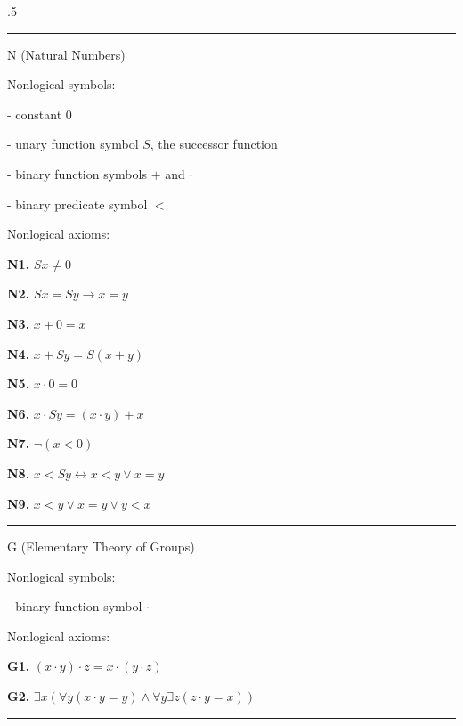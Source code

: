 \vglue .5\baselineskip

\hrule
\beginsection N (Natural Numbers)

Nonlogical symbols:
\item{-} constant $0$
\item{-} unary function symbol $S$, the successor function
\item{-} binary function symbols $+$ and $\cdot$
\item{-} binary predicate symbol $<$
\smallskip

\noindent Nonlogical axioms:
\item{} {\bf N1.} $Sx \ne 0$
\item{} {\bf N2.} $Sx = Sy \to x = y$
\item{} {\bf N3.} $x + 0 = x$
\item{} {\bf N4.} $x + Sy = S(x + y)$
\item{} {\bf N5.} $x \cdot 0 = 0$
\item{} {\bf N6.} $x \cdot Sy = (x \cdot y) + x$
\item{} {\bf N7.} $\neg (x < 0)$
\item{} {\bf N8.} $x < Sy \leftrightarrow x < y \lor x = y$
\item{} {\bf N9.} $x < y \lor x = y \lor y < x$
\smallskip
\hrule

\beginsection G (Elementary Theory of Groups)

Nonlogical symbols:
\item{-} binary function symbol $\cdot$
\smallskip

\noindent Nonlogical axioms:
\item{} {\bf G1.} $(x \cdot y) \cdot z = x \cdot (y \cdot z)$
\item{} {\bf G2.} $\exists x(\forall y(x \cdot y = y) \land \forall y \exists z(z \cdot y = x))$
\smallskip
\hrule

\vfill
\break
